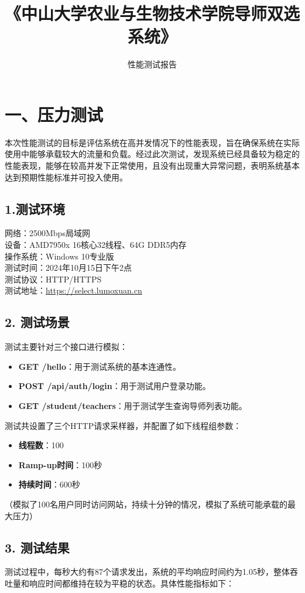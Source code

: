 \documentclass{article}
\date{}
\title{《中山大学农业与生物技术学院导师双选系统》}
\author{性能测试报告}
\begin{document}
\maketitle

\section*{一、压力测试}
本次性能测试的目标是评估系统在高并发情况下的性能表现，旨在确保系统在实际使用中能够承载较大的流量和负载。经过此次测试，发现系统已经具备较为稳定的性能表现，能够在较高并发下正常使用，且没有出现重大异常问题，表明系统基本达到预期性能标准并可投入使用。

\subsection*{1.测试环境}
网络：2500Mbps局域网 \\
设备：AMD7950x 16核心32线程、64G DDR5内存 \\
操作系统：Windows 10专业版 \\
测试时间：2024年10月15日下午2点 \\
测试协议：HTTP/HTTPS \\
测试地址：\url{https://select.lumoxuan.cn}

\subsection*{2. 测试场景}
测试主要针对三个接口进行模拟：
\begin{itemize}
    \item \textbf{GET /hello}：用于测试系统的基本连通性。
    \item \textbf{POST /api/auth/login}：用于测试用户登录功能。
    \item \textbf{GET /student/teachers}：用于测试学生查询导师列表功能。
\end{itemize}

测试共设置了三个HTTP请求采样器，并配置了如下线程组参数：
\begin{itemize}
    \item \textbf{线程数}：100
    \item \textbf{Ramp-up时间}：100秒
    \item \textbf{持续时间}：600秒
\end{itemize}
（模拟了100名用户同时访问网站，持续十分钟的情况，模拟了系统可能承载的最大压力）

\subsection*{3. 测试结果}
测试过程中，每秒大约有87个请求发出，系统的平均响应时间约为1.05秒，整体吞吐量和响应时间都维持在较为平稳的状态。具体性能指标如下：
\end{document}
